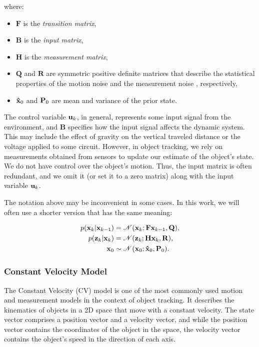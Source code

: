 where:

\begin{itemize}
    \item $\mathbf{F}$ is the \textit{transition matrix},
    \item $\mathbf{B}$ is the \textit{input matrix},
    \item $\mathbf{H}$ is the \textit{measurement matrix},
    \item $\mathbf{Q}$ and $\mathbf{R}$ are symmetric positive definite matrices
        that describe the statistical properties of the motion noise
         and the measurement noise , respectively,
    \item $\vecat{\hat x}{0}$ and $\vecat{P}{0}$ are mean and variance of the 
    prior state.
\end{itemize}

The control variable $\vecat{u}{k}$, in general, represents some input signal from the environment, and $\mathbf{B}$ specifies how the input signal affects the dynamic system. This may include the effect of gravity on the vertical traveled distance or the voltage applied to some circuit. However, in object tracking, we rely on measurements obtained from sensors to update our estimate of the object's state. We do not have control over the object's motion. Thus, the input matrix is often redundant, and we omit it (or set it to a zero matrix) along with the input variable $\vecat{u}{k}$.

The notation above may be inconvenient in some cases. In this work, we will often use a shorter version that has the same meaning:

\begin{align}
    p(\vecat{x}{k} | \vecat{x}{k-1})
        &= \mathscr{N}(\vecat{x}{k}; \mathbf{F}\vecat{x}{k-1}, \mathbf{Q}), 
        \label{eq:motion-model} \\
    p(\vecat{z}{k} | \vecat{x}{k})
        &= \mathscr{N}(\vecat{z}{k}; \mathbf{H}\vecat{x}{k}, \mathbf{R}), 
        \label{eq:measurement-model} \\
    \vecat{x}{0}
        &\sim \mathscr{N}(\vecat{x}{0}; \vecat{\hat{x}}{0}, \vecat{P}{0}).
        \label{eq:prior-x0}
\end{align}

\subsubsection{Constant Velocity Model}

The Constant Velocity (CV) model is one of the most commonly used motion and measurement models in the context of object tracking. It describes the kinematics of objects in a 2D space that move with a constant velocity. The state vector comprises a position vector and a velocity vector, and while the position vector contains the coordinates of the object in the space, the velocity vector contains the object's speed in the direction of each axis.

